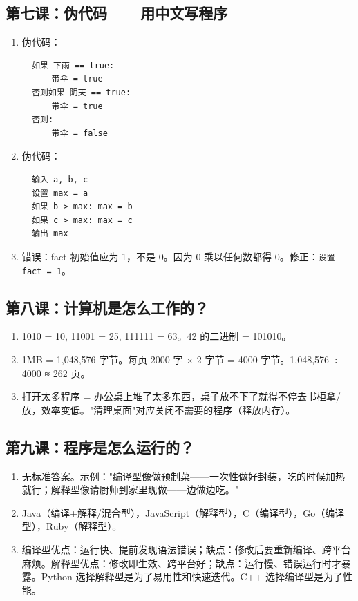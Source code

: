 \documentclass[a4paper,12pt]{ctexart}
\begin{document}
\subsection*{第七课：伪代码——用中文写程序}
\begin{enumerate}
  \item 伪代码：
  \begin{verbatim}
  如果 下雨 == true:
      带伞 = true
  否则如果 阴天 == true:
      带伞 = true
  否则:
      带伞 = false
  \end{verbatim}
  \item 伪代码：
  \begin{verbatim}
  输入 a, b, c
  设置 max = a
  如果 b > max: max = b
  如果 c > max: max = c
  输出 max
  \end{verbatim}
  \item 错误：fact 初始值应为 1，不是 0。因为 0 乘以任何数都得 0。修正：\texttt{设置 fact = 1}。
\end{enumerate}

\subsection*{第八课：计算机是怎么工作的？}
\begin{enumerate}
  \item 1010 = 10, 11001 = 25, 111111 = 63。42 的二进制 = 101010。
  \item 1MB = 1,048,576 字节。每页 2000 字 × 2 字节 = 4000 字节。1,048,576 ÷ 4000 ≈ 262 页。
  \item 打开太多程序 = 办公桌上堆了太多东西，桌子放不下了就得不停去书柜拿/放，效率变低。"清理桌面"对应关闭不需要的程序（释放内存）。
\end{enumerate}

\subsection*{第九课：程序是怎么运行的？}
\begin{enumerate}
  \item 无标准答案。示例："编译型像做预制菜——一次性做好封装，吃的时候加热就行；解释型像请厨师到家里现做——边做边吃。"
  \item Java（编译+解释/混合型），JavaScript（解释型），C（编译型），Go（编译型），Ruby（解释型）。
  \item 编译型优点：运行快、提前发现语法错误；缺点：修改后要重新编译、跨平台麻烦。解释型优点：修改即生效、跨平台好；缺点：运行慢、错误运行时才暴露。Python 选择解释型是为了易用性和快速迭代。C++ 选择编译型是为了性能。
\end{enumerate}
\end{document}
